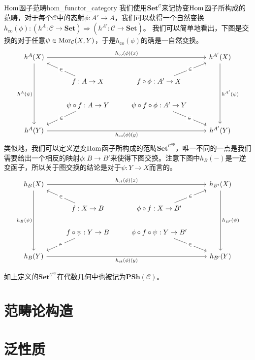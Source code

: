 \documentclass[../main.tex]{subfiles}
\begin{document}
\begin{definition}{$\operatorname{Hom}$函子范畴}{hom_functor_category}
我们使用$\mathbf{Set}^\mathcal{C}$来记协变$\operatorname{Hom}$函子所构成的范畴，对于每个$\mathcal{C}$中的态射$\phi:A'\to A$，我们可以获得一个自然变换$h_{\text{co}}(\phi):(h^A:\mathcal{C}\to\mathbf{Set})\Rightarrow(h^{A'}:\mathcal{C}\to\mathbf{Set})$。
我们可以简单地看出，下图是交换的对于任意$\psi\in\operatorname{Mor}_\mathcal{C}(X,Y)$，于是$h_\text{co}(\phi)$的确是一自然变换。
$$
\begin{tikzcd}
h^A(X) \arrow[rrr, "h_{\text{co}}(\phi)(x)"]\arrow[ddd, "h^A(\psi)"'] & {} & {} & h^{A'}(X) \arrow[ddd, "h^{A'}(\psi)"] \\ {} & f:A\to X \arrow[lu, "\in" description] & f\circ\phi:A'\to X \arrow[ru, "\in" description]&{}\\{}& \psi\circ f:A\to Y \arrow[ld, "\in" description] & \psi\circ f\circ\phi:A'\to Y \arrow[rd, "\in" description] & {} \\ h^A(Y) \arrow[rrr, "h_{\text{co}}(\phi)(y)"'] & {} & {} & h^{A'}(Y)
\end{tikzcd}
$$
类似地，我们可以定义逆变$\operatorname{Hom}$函子所构成的范畴$\mathbf{Set}^{\mathcal{C}^\text{op}}$，唯一不同的一点是我们需要给出一个相反的映射$\phi:B\to B'$来使得下图交换。注意下图中$h_B(-)$是一逆变函子，所以关于图交换的结论是对于$\psi:Y\to X$而言的。
$$
\begin{tikzcd}
h_B(X) \arrow[rrr, "h_{\text{ct}}(\phi)(x)"]\arrow[ddd, "h_B(\psi)"'] & {} & {} & h_{B'}(X) \arrow[ddd, "h_{B'}(\psi)"] \\ {} & f:X\to B \arrow[lu, "\in" description] & \phi\circ f:X\to B' \arrow[ru, "\in" description]& {} \\ {} & f\circ\psi:Y\to B \arrow[ld, "\in" description] & \phi\circ f\circ\psi:Y\to B' \arrow[rd, "\in" description] & {} \\ h_B(Y) \arrow[rrr, "h_{\text{ct}}(\phi)(y)"'] & {} & {} & h_{B'}(Y)
\end{tikzcd}
$$
\end{definition}
如上定义的$\mathbf{Set}^{\mathcal{C}^\text{op}}$在代数几何中也被记为$\mathbf{PSh}(\mathcal{C})$。

\section{范畴论构造}
\section{泛性质}
\biblio
\end{document}
